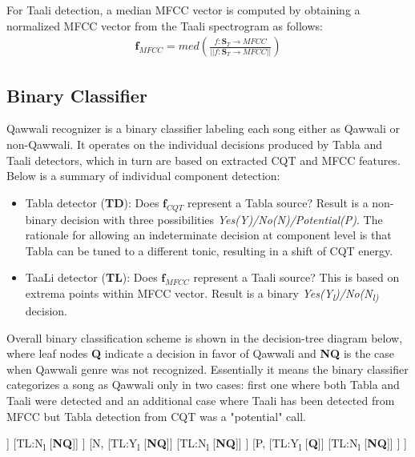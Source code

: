 \documentclass{article}
\begin{document}
For Taali detection, a median MFCC vector is computed by obtaining a normalized MFCC vector from the Taali spectrogram as follows:
\begin{align}\label{eq:eq7}
\boldsymbol{f}_{MFCC} = med(\frac{f\colon \boldsymbol{S}_{T}\to MFCC}{\lvert \lvert {f\colon \boldsymbol{S}_{T}\to MFCC} \rvert \rvert})
\end{align}

\subsection{Binary Classifier}

Qawwali recognizer is a binary classifier labeling each song either as Qawwali or non-Qawwali. It operates on the individual decisions produced by Tabla and Taali detectors, which in turn are based on extracted CQT and MFCC features. Below is a summary of individual component detection:
\begin{itemize}
	\item Tabla detector (\textbf{TD}): Does $\boldsymbol{f}_{CQT}$ represent a Tabla source? Result is a non-binary decision with three possibilities \textit{Yes(Y)/No(N)/Potential(P)}. The rationale for allowing an indeterminate decision at component level is that Tabla can be tuned to a different tonic, resulting in a shift of CQT energy.
	\item TaaLi detector (\textbf{TL}): Does $\boldsymbol{f}_{MFCC}$ represent a Taali source? This is based on extrema points within MFCC vector. Result is a binary \textit{Yes(Y\textsubscript{l})/No(N\textsubscript{l)}} decision.
\end{itemize}
Overall binary classification scheme is shown in the decision-tree diagram below, where leaf nodes \textbf{Q} indicate a decision in favor of Qawwali and \textbf{NQ} is the case when Qawwali genre was not recognized. Essentially it means the binary classifier categorizes a song as Qawwali only in two cases: first one where both Tabla and Taali were detected and an additional case where Taali has been detected from MFCC but Tabla detection from CQT was a "potential" call. 

\begin{forest}
[TD,
	[Y,
		[TL:Y\textsubscript{l}
			[\textbf{Q}]]
		[TL:N\textsubscript{l}
			[\textbf{NQ}]]
	]
	[N,
		[TL:Y\textsubscript{l}
			[\textbf{NQ}]]
		[TL:N\textsubscript{l}
			[\textbf{NQ}]]
	]
	[P,
		[TL:Y\textsubscript{l}
			[\textbf{Q}]]
		[TL:N\textsubscript{l}
			[\textbf{NQ}]]
	]
]
\end{forest}
\end{document}
